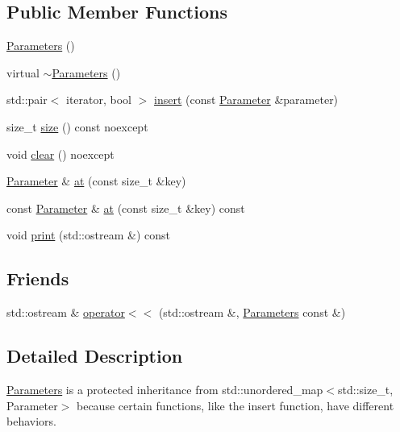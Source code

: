 \subsection*{Public Member Functions}
\begin{DoxyCompactItemize}
\item 
\mbox{\hyperlink{class_parameters_af4d94ee360ac0157d9065f78797fe9a1}{Parameters}} ()
\item 
virtual \mbox{\hyperlink{class_parameters_a640a1a349975a8cb023696f25e563a5c}{$\sim$\+Parameters}} ()
\item 
std\+::pair$<$ iterator, bool $>$ \mbox{\hyperlink{class_parameters_ab643a6115d93d3142247f4a3ecf79d59}{insert}} (const \mbox{\hyperlink{class_parameter}{Parameter}} \&parameter)
\item 
size\+\_\+t \mbox{\hyperlink{class_parameters_ab8f80cdc799915ce3f551b385067b8f2}{size}} () const noexcept
\item 
void \mbox{\hyperlink{class_parameters_a8992e16aa53bfe4423adfe08182e2507}{clear}} () noexcept
\item 
\mbox{\hyperlink{class_parameter}{Parameter}} \& \mbox{\hyperlink{class_parameters_a719a79f29caa1c2adeee85ab8a963f40}{at}} (const size\+\_\+t \&key)
\item 
const \mbox{\hyperlink{class_parameter}{Parameter}} \& \mbox{\hyperlink{class_parameters_aa52d49e7e5d0e112a90a3cd288c477ce}{at}} (const size\+\_\+t \&key) const
\item 
void \mbox{\hyperlink{class_parameters_adff840358049658c4bb93c2b17480e74}{print}} (std\+::ostream \&) const
\end{DoxyCompactItemize}
\subsection*{Friends}
\begin{DoxyCompactItemize}
\item 
std\+::ostream \& \mbox{\hyperlink{class_parameters_a8ffabb0f94a5698a8a711fa5c449e622}{operator$<$$<$}} (std\+::ostream \&, \mbox{\hyperlink{class_parameters}{Parameters}} const \&)
\end{DoxyCompactItemize}


\subsection{Detailed Description}
\mbox{\hyperlink{class_parameters}{Parameters}} is a protected inheritance from std\+::unordered\+\_\+map$<$std\+::size\+\_\+t, Parameter$>$ because certain functions, like the insert function, have different behaviors. 

